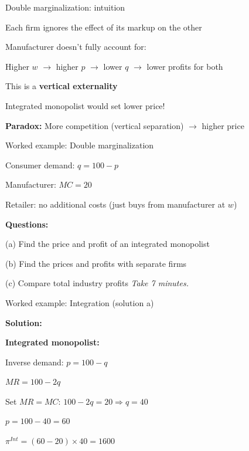 \documentclass[notes,11pt, aspectratio=169]{beamer}
\newenvironment{wideitemize}{\itemize\addtolength{\itemsep}{10pt}}{\enditemize}
\begin{document}
\begin{frame}{Double marginalization: intuition}
	\begin{wideitemize}
		\item Each firm ignores the effect of its markup on the other
		\item Manufacturer doesn't fully account for:
		\begin{wideitemize}
			\vspace{5pt}
			\item Higher $w$ $\rightarrow$ higher $p$ $\rightarrow$ lower $q$ $\rightarrow$ lower profits for both
		\end{wideitemize}
		\item This is a \textbf{vertical externality}
		\item Integrated monopolist would set lower price!
		\item \textbf{Paradox:} More competition (vertical separation) $\rightarrow$ higher price
	\end{wideitemize}
\end{frame}

\begin{frame}{Worked example: Double marginalization}
	\begin{wideitemize}
		\item Consumer demand: $q = 100 - p$
		\item Manufacturer: $MC = 20$
		\item Retailer: no additional costs (just buys from manufacturer at $w$)
		\item \textbf{Questions:}
		\item (a) Find the price and profit of an integrated monopolist
		\item (b) Find the prices and profits with separate firms
		\item (c) Compare total industry profits
	\end{wideitemize}
	\vspace{10pt}
	\centering
	\textit{Take 7 minutes.}
\end{frame}

\begin{frame}{Worked example: Integration (solution a)}
	\begin{wideitemize}
		\item \textbf{Solution:}
		\item \textbf{Integrated monopolist:}
		\item Inverse demand: $p = 100 - q$
		\item $MR = 100 - 2q$
		\item Set $MR = MC$: $100 - 2q = 20 \Rightarrow q = 40$
		\item $p = 100 - 40 = 60$
		\item $\pi^{Int} = (60 - 20) \times 40 = 1600$
	\end{wideitemize}
\end{frame}
\end{document}
